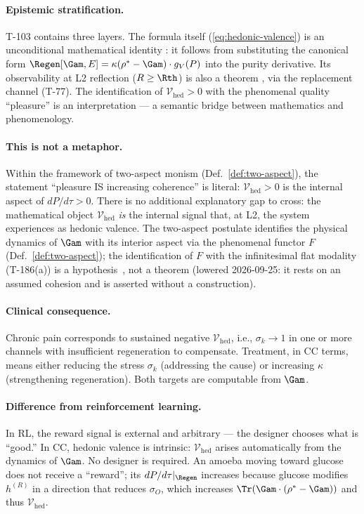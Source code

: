 \paragraph{Epistemic stratification.}
T-103 contains three layers.  The formula itself (\ref{eq:hedonic-valence}) is an
unconditional mathematical identity : it follows from substituting the
canonical form $\Regen[\Gam, E] = \kappa(\rho^* - \Gam) \cdot g_V(P)$ into the purity
derivative.  Its observability at L2 reflection ($R \geq \Rth$) is also a theorem ,
via the replacement channel (T-77).  The identification of
$\mathcal{V}_{\mathrm{hed}} > 0$ with the phenomenal quality ``pleasure'' is an
interpretation  --- a semantic bridge between mathematics and phenomenology.

\paragraph{This is not a metaphor.}
Within the framework of two-aspect monism (Def.~\ref{def:two-aspect}), the
statement ``pleasure IS increasing coherence'' is literal: $\mathcal{V}_{\mathrm{hed}}
> 0$ is the internal aspect of $dP/d\tau > 0$. There is no additional
explanatory gap to cross: the mathematical object $\mathcal{V}_{\mathrm{hed}}$
\emph{is} the internal signal that, at L2, the system experiences as hedonic
valence. The two-aspect postulate identifies the physical dynamics of $\Gam$
with its interior aspect via the phenomenal functor $F$
(Def.~\ref{def:two-aspect}); the identification of $F$ with the
infinitesimal flat modality (T-186(a)) is a hypothesis~, not a
theorem (lowered 2026-09-25: it rests on an assumed cohesion and is asserted
without a construction).

\paragraph{Clinical consequence.}
Chronic pain corresponds to sustained negative $\mathcal{V}_{\mathrm{hed}}$, i.e.,
$\sigma_k \to 1$ in one or more channels with insufficient regeneration to compensate.
Treatment, in CC terms, means either reducing the stress $\sigma_k$ (addressing the cause)
or increasing $\kappa$ (strengthening regeneration).  Both targets are computable from $\Gam$.

\paragraph{Difference from reinforcement learning.}
In RL, the reward signal is external and arbitrary --- the designer chooses what is
``good.''  In CC, hedonic valence is intrinsic: $\mathcal{V}_{\mathrm{hed}}$ arises
automatically from the dynamics of $\Gam$.  No designer is required.  An amoeba moving
toward glucose does not receive a ``reward''; its $dP/d\tau|_{\Regen}$ increases because
glucose modifies $h^{(R)}$ in a direction that reduces $\sigma_O$, which increases
$\Tr(\Gam \cdot (\rho^* - \Gam))$ and thus $\mathcal{V}_{\mathrm{hed}}$.

